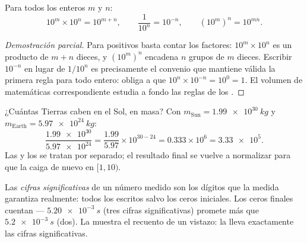 \begin{proposition}\label{prop:g10:orders-of-magnitude:powers}
Para todos los enteros $m$ y $n$:
\[
10^{m} \times 10^{n} = 10^{m+n}, \qquad
\frac{1}{10^{n}} = 10^{-n}, \qquad
\left(10^{m}\right)^{n} = 10^{mn}.
\]
\end{proposition}

\begin{proof}[Demostración parcial]
Para  positivos basta contar los factores: $10^{m} \times
10^{n}$ es un producto de $m + n$ dieces, y $(10^m)^n$ encadena $n$
grupos de $m$ dieces. Escribir $10^{-n}$ en lugar de $1/10^{n}$ es
precisamente el convenio que mantiene válida la primera regla para todo
entero: obliga a que $10^{n} \times 10^{-n} = 10^{0} = 1$. El volumen de
matemáticas correspondiente estudia a fondo las reglas de los
.
\end{proof}

\begin{example}\label{ex:g10:orders-of-magnitude:scinot}
¿Cuántas Tierras caben en el Sol, en masa? Con
$m_{\text{Sun}} = \qty{1.99e30}{kg}$ y
$m_{\text{Earth}} = \qty{5.97e24}{kg}$:
\[
\frac{\num{1.99e30}}{\num{5.97e24}}
= \frac{1.99}{5.97} \times 10^{30-24}
= 0.333 \times 10^{6}
= \num{3.33e5}.
\]
Las  y los  se tratan por separado; el resultado final
se vuelve a normalizar para que la  caiga de nuevo en $[1, 10)$.
\end{example}

\begin{definition}\label{def:g10:orders-of-magnitude:sigfig}
Las \emph{cifras significativas} de un
número medido son los dígitos que la medida garantiza realmente: todos
los escritos salvo los ceros iniciales. Los ceros finales cuentan ---
$\qty{5.20e-3}{s}$ (tres cifras significativas) promete más que
$\qty{5.2e-3}{s}$ (dos). La  muestra el recuento de
un vistazo: la  lleva exactamente las cifras significativas.
\end{definition}

